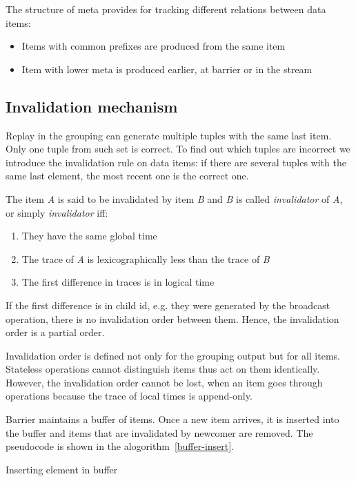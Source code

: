 The structure of meta provides for tracking different relations between data items:

\begin{itemize}
  \item Items with common prefixes are produced from the same item
  \item Item with lower meta is produced earlier, at barrier or in the stream
\end{itemize}

\subsection{Invalidation mechanism}

Replay in the grouping can generate multiple tuples with the same last item. Only one tuple from such set is correct. To find out which tuples are incorrect we introduce the invalidation rule on data items: if there are several tuples with the same last element, the most recent one is the correct one.

The item {\it A} is said to be invalidated by item {\it B} and {\it B} is called {\it invalidator} of {\it A}, or simply {\it invalidator} iff:

\begin{enumerate}
\item They have the same global time
\item The trace of {\it A} is lexicographically less than the trace of {\it B}
\item The first difference in traces is in logical time
\end{enumerate}

If the first difference is in child id, e.g. they were generated by the broadcast operation, there is no invalidation order between them. Hence, the invalidation order is a partial order. 

Invalidation order is defined not only for the grouping output but for all items. Stateless operations cannot distinguish items thus act on them identically. However, the invalidation order cannot be lost, when an item goes through operations because the trace of local times is append-only.

Barrier maintains a buffer of items. Once a new item arrives, it is inserted into the buffer and items that are invalidated by newcomer are removed. The pseudocode is shown in the alogorithm~\ref{buffer-insert}.

\begin{algorithm}
\caption{Inserting element in buffer}
\label{buffer-insert}
\begin{algorithmic}
        \State {}
      \EndIf
    \EndFor
    \State {}
  \EndFunction
\end{algorithmic}
\end{algorithm}

